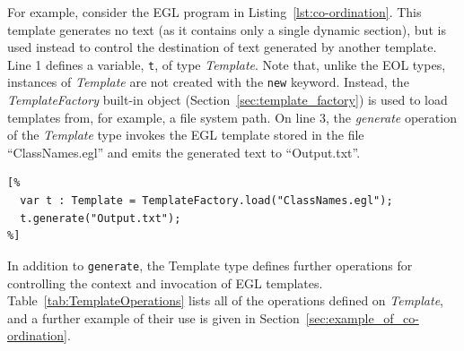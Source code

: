 For example, consider the EGL program in Listing~\ref{lst:co-ordination}.
This template generates no text (as it contains only a single dynamic section),
but is used instead to control the destination of text generated by another
template. Line 1 defines a variable, \texttt{t}, of type \emph{Template}. 
Note that, unlike the EOL types, instances of \emph{Template} are not created
with the \texttt{new} keyword. Instead, the \emph{TemplateFactory} built-in
object (Section~\ref{sec:template_factory}) is used to load templates from, 
for example, a file system path. On line 3, the \emph{generate} operation 
of the \emph{Template} type invokes the EGL template
stored in the file ``ClassNames.egl'' and emits the generated text to 
``Output.txt''.

\begin{lstlisting}[basicstyle=\ttfamily\footnotesize, language=EGL, tabsize=2, flexiblecolumns=true, caption=Storing the name of each Class to disk., label=lst:co-ordination]
[%
  var t : Template = TemplateFactory.load("ClassNames.egl");
  t.generate("Output.txt");
%]
\end{lstlisting}

In addition to \texttt{generate}, the Template type defines further operations for controlling the context and invocation of EGL templates. Table~\ref{tab:TemplateOperations} lists all of the operations defined on \emph{Template}, and a further example of their use is given in Section~\ref{sec:example_of_co-ordination}.

